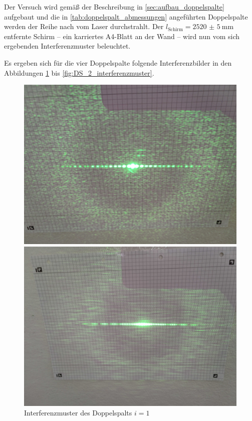\documentclass[ngerman]{scrartcl}
\begin{document}
Der Versuch wird gemäß der Beschreibung in \autoref{sec:aufbau_doppelspalte} aufgebaut und die in \autoref{tab:doppelspalt_abmessungen} angeführten Doppelspalte werden der Reihe nach vom Laser durchstrahlt. Der $l_\text{Schirm} = \SI{2520(5)}{\milli\meter}$ entfernte Schirm -- ein karriertes A4-Blatt an der Wand -- wird nun vom sich ergebenden Interferenzmuster beleuchtet.

Es ergeben sich für die vier Doppelspalte folgende Interferenzbilder in den Abbildungen \ref{fig:DS_1_interferenzmuster} bis \ref{fig:DS_2_interferenzmuster}.
%
\setcapindent{0pt}
\begin{figure}[H]
    \centering
    \begin{minipage}[t]{0.45\linewidth}
        \centering
        \includegraphics[width=\linewidth]{fig/Compressed/DS1_0_20_25.jpg}
        \caption{Interferenzmuster des Doppelspalts $i = 1$}
        \label{fig:DS_1_interferenzmuster}
        \includegraphics[width=\linewidth]{fig/Compressed/DS3_0_10_5.jpg}

\end{minipage}
\end{figure}
\end{document}
